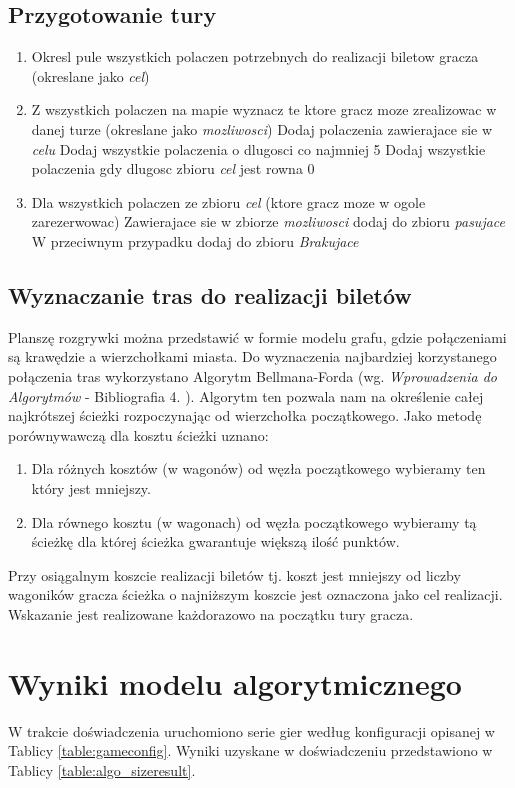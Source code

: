 \documentclass[12pt, oneside]{report}
\begin{document}
\subsection{Przygotowanie tury}
\begin{enumerate}
	\item Okresl pule wszystkich polaczen potrzebnych do realizacji biletow gracza (okreslane jako \textit{cel})
	\item Z wszystkich polaczen na mapie wyznacz te ktore gracz moze zrealizowac w danej turze (okreslane jako \textit{mozliwosci})
	\subitem Dodaj polaczenia zawierajace sie w \textit{celu}
	\subitem Dodaj wszystkie polaczenia o dlugosci co najmniej 5
	\subitem Dodaj wszystkie polaczenia gdy dlugosc zbioru \textit{cel} jest rowna 0
	\item Dla wszystkich polaczen ze zbioru \textit{cel} (ktore gracz moze w ogole zarezerwowac)
	\subitem Zawierajace sie w zbiorze \textit{mozliwosci} dodaj do zbioru \textit{pasujace}
	\subitem W przeciwnym przypadku dodaj do zbioru \textit{Brakujace}
	
\end{enumerate}
\subsection{Wyznaczanie tras do realizacji biletów}
Planszę rozgrywki można przedstawić w formie modelu grafu, gdzie połączeniami są krawędzie a wierzchołkami miasta. Do wyznaczenia najbardziej korzystanego połączenia tras wykorzystano Algorytm Bellmana-Forda (wg. \textit{Wprowadzenia do Algorytmów} - Bibliografia 4. ). Algorytm ten pozwala nam na określenie całej najkrótszej ścieżki rozpoczynając od wierzchołka początkowego. Jako metodę porównywawczą dla kosztu ścieżki uznano:
\begin{enumerate}
	\item Dla różnych kosztów (w wagonów) od węzła początkowego wybieramy ten który jest mniejszy.
	\item Dla równego kosztu (w wagonach) od węzła początkowego wybieramy tą ścieżkę dla której ścieżka gwarantuje większą ilość punktów.
\end{enumerate}
Przy osiągalnym koszcie realizacji biletów tj. koszt jest mniejszy od liczby wagoników gracza ścieżka o najniższym koszcie jest oznaczona jako cel realizacji. Wskazanie jest realizowane każdorazowo na początku tury gracza.
\section{Wyniki modelu algorytmicznego}
W trakcie doświadczenia uruchomiono serie gier według konfiguracji opisanej w Tablicy \ref{table:gameconfig}. Wyniki uzyskane w doświadczeniu przedstawiono w Tablicy \ref{table:algo_sizeresult}.
\end{document}
